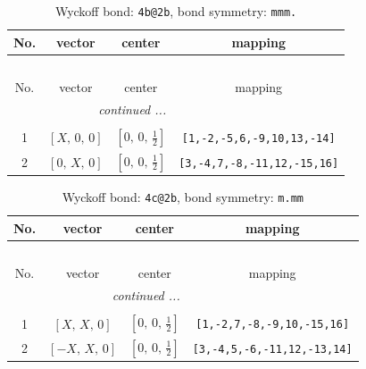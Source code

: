 \documentclass[fleqn,8pt]{jsarticle}
\begin{document}
\renewcommand{\arraystretch}{1.2}
\begin{longtable}{cccc}
\caption{Wyckoff bond: {\tt 4b@2b}, bond symmetry: {\tt mmm.}}
 \\
 \hline \hline
No. & vector & center & mapping \\ \hline \endfirsthead

\multicolumn{3}{l}{\tablename\ \thetable{}} \\
 \hline \hline
No. & vector & center & mapping \\ \hline \endhead

 \hline \hline
\multicolumn{3}{r}{\footnotesize\it continued ...} \\ \endfoot

 \hline \hline
\multicolumn{3}{r}{} \\ \endlastfoot

1 & $\left[ X,\, 0,\, 0 \right]$ & $\left[ 0,\, 0,\, \frac{1}{2} \right]$ & {\tt [1,-2,-5,6,-9,10,13,-14]} \\ \hline
2 & $\left[ 0,\, X,\, 0 \right]$ & $\left[ 0,\, 0,\, \frac{1}{2} \right]$ & {\tt [3,-4,7,-8,-11,12,-15,16]} \\
\end{longtable}
\renewcommand{\arraystretch}{1.2}
\begin{longtable}{cccc}
\caption{Wyckoff bond: {\tt 4c@2b}, bond symmetry: {\tt m.mm}}
 \\
 \hline \hline
No. & vector & center & mapping \\ \hline \endfirsthead

\multicolumn{3}{l}{\tablename\ \thetable{}} \\
 \hline \hline
No. & vector & center & mapping \\ \hline \endhead

 \hline \hline
\multicolumn{3}{r}{\footnotesize\it continued ...} \\ \endfoot

 \hline \hline
\multicolumn{3}{r}{} \\ \endlastfoot

1 & $\left[ X,\, X,\, 0 \right]$ & $\left[ 0,\, 0,\, \frac{1}{2} \right]$ & {\tt [1,-2,7,-8,-9,10,-15,16]} \\ \hline
2 & $\left[ - X,\, X,\, 0 \right]$ & $\left[ 0,\, 0,\, \frac{1}{2} \right]$ & {\tt [3,-4,5,-6,-11,12,-13,14]} \\
\end{longtable}
\renewcommand{\arraystretch}{1.2}
\end{document}
